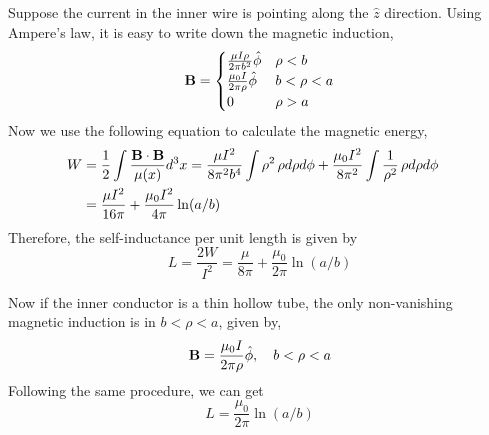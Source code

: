 \documentclass[12pt]{article}
\newcommand{\B}{{\bf B}}
\begin{document}
\newpage
{} Suppose the current in the inner wire is pointing along the $\hat{z}$ direction. Using Ampere's law, it is easy to write down the magnetic induction,
\begin{equation}
    \B = \begin{cases}
        \frac{\mu I \rho}{2\pi b^2} \hat{\phi} & \rho < b\\
        \frac{\mu_0 I}{2\pi \rho} \hat{\phi}& b < \rho < a\\
        0 & \rho > a
    \end{cases}
\end{equation}
Now we use the following equation to calculate the magnetic energy,
\begin{align}
    W &= \frac{1}{2}\int \frac{\B \cdot \B}{\mu(x)} d^3x = \frac{\mu I^2}{8\pi^2 b^4} \int \rho^2\, \rho d\rho d\phi + \frac{\mu_0 I^2}{8 \pi^2} \int \frac{1}{\rho^2} \, \rho d\rho d\phi \cr
    &= \frac{\mu I^2}{16 \pi} + \frac{\mu_0 I^2}{4\pi} \ln(a/b)
\end{align}
Therefore, the self-inductance per unit length is given by
\begin{equation}
    \boxed{
    L = \frac{2W}{I^2} = \frac{\mu}{8 \pi} + \frac{\mu_0}{2\pi} \ln(a/b)}
\end{equation}

Now if the inner conductor is a thin hollow tube, the only non-vanishing magnetic induction is in $b < \rho < a$, given by,
\begin{equation}
    \B = \frac{\mu_0 I}{2\pi \rho} \hat{\phi}, \quad b < \rho < a
\end{equation}
Following the same procedure, we can get
\begin{equation}
    \boxed{
        L = \frac{\mu_0}{2\pi} \ln(a/b)
    }
\end{equation}
\end{document}
